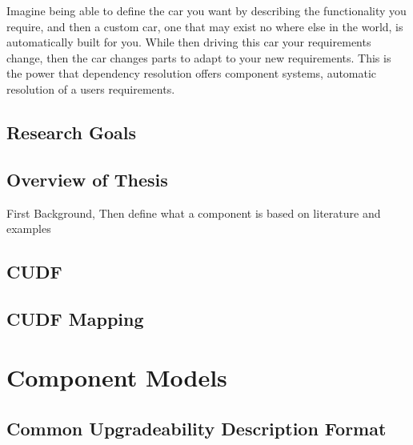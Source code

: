 \documentclass{report}
\begin{document}
Imagine being able to define the car you want by describing the functionality you require, and then a custom car, one that may exist no where else in the world,
is automatically built for you. 
While then driving this car your requirements change, then the car changes parts to adapt to your new requirements.
This is the power that dependency resolution offers component systems, automatic resolution of a users requirements.

\section{Research Goals}



\section{Overview of Thesis}
First Background,
Then define what a component is based on literature and examples














\section{CUDF}

\section{CUDF Mapping}



\chapter{Component Models}

\section{Common Upgradeability Description Format}
\end{document}

